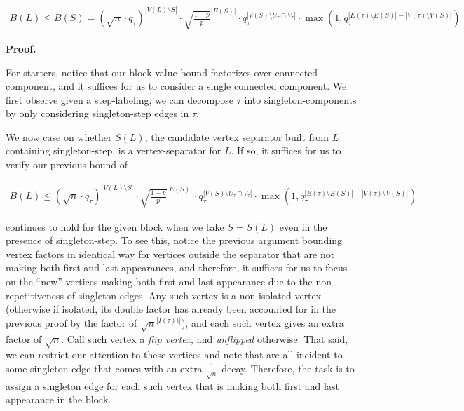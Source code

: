 \documentclass[10pt,a4paper]{article}
\begin{document}
\[\begin{gathered}
B(L)\leq B(S)=(\sqrt{n}\cdot q_{\tau})^{|V(L)\setminus S|}\cdot\sqrt{\frac{1-p}{p}}^{|E(S)|}\cdot q_{\tau}^{|V(S)\setminus U_{\tau}\cap V_{\tau}|}\cdot\max(1,q_{\tau}^{|E(\tau)\setminus E(S)|-|V(\tau)\setminus V(S)|})
\end{gathered}\]







\par\medskip\noindent\textbf{Proof.}\par




For starters, notice that our block-value bound factorizes over connected component, and it suffices for us to consider a single connected component.
We first observe given a step-labeling, we can decompose $\tau$ into singleton-components by only considering singleton-step edges in $\tau$.\par




We now case on whether $S(L)$, the candidate vertex separator built from $L$ containing singleton-step, is a vertex-separator for $L$. If so, it suffices for us to verify our previous bound of\par


\[\begin{gathered}
B(L)\leq(\sqrt{n}\cdot q_{\tau})^{|V(L)\setminus S|}\cdot\sqrt{\frac{1-p}{p}}^{|E(S)|}\cdot q_{\tau}^{|V(S)\setminus U_{\tau}\cap V_{\tau}|}\cdot\max(1,q_{\tau}^{|E(\tau)\setminus E(S)|-|V(\tau)\setminus V(S)|})
\end{gathered}\]


continues to hold for the given block when we take $S=S(L)$ even in the presence of singleton-step.
To see this, notice the previous argument bounding vertex factors in identical way for vertices outside the separator that are not making both first and last appearances, and therefore, it suffices for us to focus on the “new” vertices making both first and last appearance due to the non-repetitiveness of singleton-edges. Any such vertex is a non-isolated vertex (otherwise if isolated, its double factor has already been accounted for in the previous proof by the factor of $\sqrt{n}^{|I(\tau))|}$), and
each such vertex gives an extra factor of $\sqrt{n}$. Call such vertex a \emph{flip vertex}, and \emph{unflipped} otherwise. That said, we can restrict our attention to these vertices and note that are all incident to some singleton edge that comes with an extra $\frac{1}{\sqrt{n}}$ decay. Therefore, the task is to assign a singleton edge for each such vertex that is making both first and last appearance in the block.\par
\end{document}
